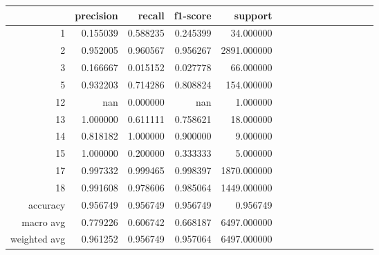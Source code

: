 \begin{table}[h]
\centering
\label{table:5}
\begin{tabular}{rrrrrrrrrrrrrrr}
\toprule
 & precision & recall & f1-score & support \\
\midrule
1 & 0.155039 & 0.588235 & 0.245399 & 34.000000 \\
2 & 0.952005 & 0.960567 & 0.956267 & 2891.000000 \\
3 & 0.166667 & 0.015152 & 0.027778 & 66.000000 \\
5 & 0.932203 & 0.714286 & 0.808824 & 154.000000 \\
12 & nan & 0.000000 & nan & 1.000000 \\
13 & 1.000000 & 0.611111 & 0.758621 & 18.000000 \\
14 & 0.818182 & 1.000000 & 0.900000 & 9.000000 \\
15 & 1.000000 & 0.200000 & 0.333333 & 5.000000 \\
17 & 0.997332 & 0.999465 & 0.998397 & 1870.000000 \\
18 & 0.991608 & 0.978606 & 0.985064 & 1449.000000 \\
accuracy & 0.956749 & 0.956749 & 0.956749 & 0.956749 \\
macro avg & 0.779226 & 0.606742 & 0.668187 & 6497.000000 \\
weighted avg & 0.961252 & 0.956749 & 0.957064 & 6497.000000 \\
\bottomrule
\end{tabular}
\end{table}
